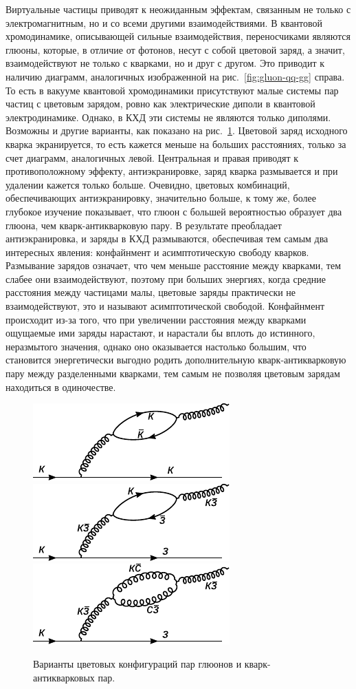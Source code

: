 \documentclass[a4paper, 12pt]{article}
\begin{document}
Виртуальные частицы приводят к неожиданным эффектам, связанным не только с электромагнитным, но и со всеми другими взаимодействиями. 
В квантовой хромодинамике, описывающей сильные взаимодействия, переносчиками являются глюоны, которые, в отличие от фотонов, несут с собой цветовой заряд, а значит, взаимодействуют не только с кварками, но и друг с другом. 
Это приводит к наличию диаграмм, аналогичных изображенной на рис.~\ref{fig:gluon-qq-gg} справа.
То есть в вакууме квантовой хромодинамики присутствуют малые системы пар частиц с цветовым зарядом, ровно как электрические диполи в квантовой электродинамике. 
Однако, в КХД эти системы не являются только диполями. Возможны и другие варианты, как показано на рис.~\ref{fig:color-nondipoles}.
Цветовой заряд исходного кварка экранируется, то есть кажется меньше на больших расстояниях, только за счет диаграмм, аналогичных левой. Центральная и правая приводят к противоположному эффекту, антиэкранировке, заряд кварка размывается и при удалении кажется только больше. 
Очевидно, цветовых комбинаций, обеспечивающих антиэкранировку, значительно больше, к тому же, более глубокое изучение показывает, что глюон с большей вероятностью образует два глюона, чем кварк-антикварковую пару. 
В результате преобладает антиэкранировка, и заряды в КХД размываются, обеспечивая тем самым два интересных явления: конфайнмент и асимптотическую свободу кварков. 
Размывание зарядов означает, что чем меньше расстояние между кварками, тем слабее они взаимодействуют, поэтому при больших энергиях, когда средние расстояния между частицами малы, цветовые заряды практически не взаимодействуют, это и называют асимптотической свободой. 
Конфайнмент происходит из-за того, что при увеличении расстояния между кварками ощущаемые ими заряды нарастают, и нарастали бы вплоть до истинного, неразмытого значения, однако оно оказывается настолько большим, что становится энергетически выгодно родить дополнительную кварк-антикварковую пару между разделенными кварками, тем самым не позволяя цветовым зарядам находиться в одиночестве. 

\begin{figure}
\includegraphics[width=.32\linewidth]{figs/Color-dipole}
\hfill
\includegraphics[width=.32\linewidth]{figs/Color-qq-nond}
\hfill
\includegraphics[width=.32\linewidth]{figs/Color-gg-nond}
\caption{Варианты цветовых конфигураций пар глюонов и кварк-антикварковых пар.}
\label{fig:color-nondipoles}
\end{figure}
\end{document}
